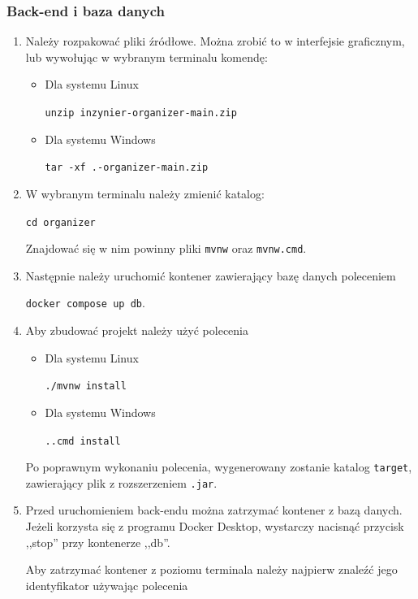 \documentclass[a4paper,twoside,12pt]{book}
\begin{document}
\subsubsection{Back-end i baza danych}
\begin{enumerate}
   \item Należy rozpakować pliki źródłowe. Można zrobić to w interfejsie graficznym, lub wywołując w wybranym terminalu komendę:
   \begin{itemize}
		\item Dla systemu Linux

		\texttt{unzip inzynier-organizer-main.zip}

		\item Dla systemu Windows

		\texttt{tar -xf .\inzynier-organizer-main.zip}
   \end{itemize}

   \item W wybranym terminalu należy zmienić katalog: 

\texttt{cd organizer}

Znajdować się w nim powinny pliki \texttt{mvnw} oraz \texttt{mvnw.cmd}.
   \item Następnie należy uruchomić kontener zawierający bazę danych poleceniem 

\texttt{docker compose up db}.
   \item Aby zbudować projekt należy użyć polecenia 

   \begin{itemize}
	\item Dla systemu Linux

	\texttt{./mvnw install}

	\item Dla systemu Windows

	\texttt{.\mvnw.cmd install}
\end{itemize}

 Po poprawnym wykonaniu polecenia, wygenerowany zostanie katalog \texttt{target}, zawierający plik z rozszerzeniem \texttt{.jar}.

	\item Przed uruchomieniem back-endu można zatrzymać kontener z bazą danych. Jeżeli korzysta się z programu Docker Desktop, wystarczy nacisnąć przycisk ,,stop'' przy kontenerze ,,db''.

	Aby zatrzymać kontener z poziomu terminala należy najpierw znaleźć jego identyfikator używając polecenia 


\end{enumerate}
\end{document}
